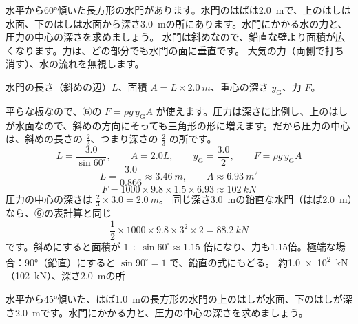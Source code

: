 \begin{phreidai}[斜めの水門]
\label{ph:力-12:ex8}水平から60°傾いた長方形の水門があります。水門のはばは\qty{2.0}{m}で、上のはしは水面、下のはしは水面から深さ\qty{3.0}{m}の所にあります。水門にかかる水の力と、圧力の中心の深さを求めましょう。
\phbamen
水門は斜めなので、鉛直な壁より面積が広くなります。力は、どの部分でも水門の面に垂直です。
\phmushi
大気の力（両側で打ち消す）、水の流れを無視します。
\phzu
\noindent\begin{minipage}[c]{0.40\linewidth}\centering
{}
\end{minipage}\hfill
\begin{minipage}[c]{0.57\linewidth}\raggedright
水門の長さ（斜めの辺）$L$、面積 $A=L\times\qty{2.0}{m}$、重心の深さ $y_{\mathrm{G}}$、力 $F$。
\end{minipage}
\phriyu
平らな板なので、⑥の $F=\rho g\,y_{\mathrm{G}}A$ が使えます。圧力は深さに比例し、上のはしが水面なので、斜めの方向にそっても三角形の形に増えます。だから圧力の中心は、斜めの長さの $\tfrac{2}{3}$、つまり深さの $\tfrac{2}{3}$ の所です。
\phtateru
\[ L=\frac{3.0}{\sin60^\circ},\qquad A=2.0L,\qquad y_{\mathrm{G}}=\frac{3.0}{2},\qquad F=\rho g\,y_{\mathrm{G}}A \]
\phtoku
\[ L=\frac{3.0}{0.866}\approx\qty{3.46}{m},\qquad A\approx\qty{6.93}{m^2} \]
\[ F=1000\times9.8\times1.5\times6.93\approx\qty{102}{kN} \]
圧力の中心の深さは $\tfrac{2}{3}\times3.0=\qty{2.0}{m}$。
\phtashikame
同じ深さ\qty{3.0}{m}の鉛直な水門（はば\qty{2.0}{m}）なら、⑥の表計算と同じ
\[ \frac{1}{2}\times1000\times9.8\times3^2\times2=\qty{88.2}{kN} \]
です。斜めにすると面積が $1\div \sin60^\circ\approx1.15$ 倍になり、力も1.15倍。極端な場合：90°（鉛直）にすると $\sin90^\circ=1$ で、鉛直の式にもどる。
\kotae 約\qty{1.0e2}{kN}（\qty{102}{kN}）、深さ\qty{2.0}{m}の所
\end{phreidai}
\begin{jibun}
水平から45°傾いた、はば\qty{1.0}{m}の長方形の水門の上のはしが水面、下のはしが深さ\qty{2.0}{m}です。水門にかかる力と、圧力の中心の深さを求めましょう。
\end{jibun}

